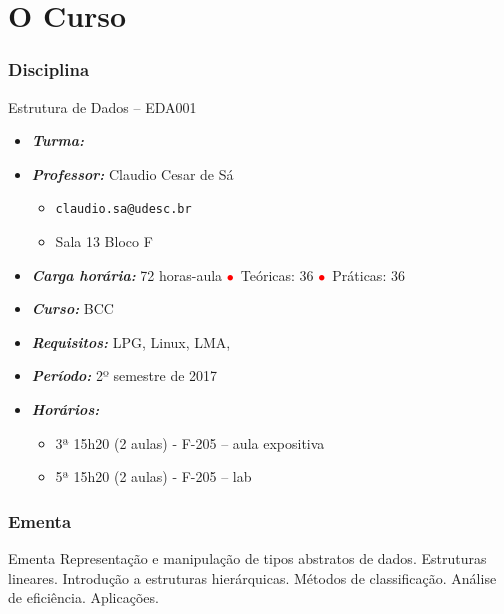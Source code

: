 
\section{O Curso}
\begin{frame}


\frametitle{Disciplina}

\begin{block}{Estrutura de Dados -- EDA001}

\begin{itemize}
\item \emph{\textbf{Turma:}} 
\item \emph{\textbf{Professor:}} Claudio Cesar de Sá
  \begin{itemize}
  \item \texttt{claudio.sa@udesc.br}
  \item Sala 13 Bloco F
  \end{itemize}
\item \emph{\textbf{Carga horária:}} 72 horas-aula 
\textcolor{red}{$\bullet$}~Teóricas: 36 \textcolor{red}{$\bullet$}~Práticas: 36
\item \emph{\textbf{Curso:}} BCC
\item \emph{\textbf{Requisitos:}} LPG, Linux, LMA,
\item \emph{\textbf{Período:}} 2º semestre de 2017
\item \emph{\textbf{Horários:}}
  \begin{itemize}
  \item 3ª 15h20 (2 aulas) - F-205  -- aula expositiva
  \item 5ª 15h20 (2 aulas) - F-205 -- lab
  
  \end{itemize}

\end{itemize}

\end{block}

\end{frame}


\begin{frame}
\frametitle{Ementa}

\begin{block}{Ementa}
Representação e manipulação de tipos abstratos de dados. Estruturas lineares. Introdução a estruturas hierárquicas. Métodos de classificação. Análise de eficiência. Aplicações.
\end{block}

\end{frame}

